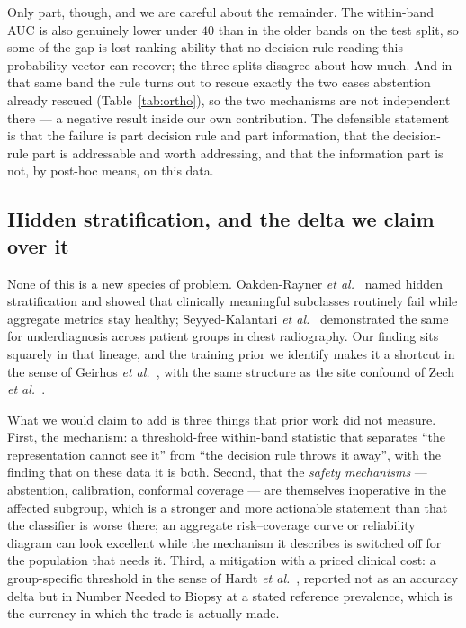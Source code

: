 \documentclass[journal]{IEEEtran}
\begin{document}
Only part, though, and we are careful about the remainder. The within-band AUC is also
genuinely lower under $40$ than in the older bands on the test split, so some of the gap is
lost ranking ability that no decision rule reading this probability vector can recover; the
three splits disagree about how much. And in that same band the rule turns out to rescue
exactly the two cases abstention already rescued (Table~\ref{tab:ortho}), so the two
mechanisms are not independent there --- a negative result inside our own contribution. The
defensible statement is that the failure is part decision rule and part information, that the
decision-rule part is addressable and worth addressing, and that the information part is not,
by post-hoc means, on this data.

\subsection{Hidden stratification, and the delta we claim over it}
None of this is a new species of problem. Oakden-Rayner
\emph{et al.}~\cite{oakdenrayner2020hidden} named hidden stratification and showed that
clinically meaningful subclasses routinely fail while aggregate metrics stay healthy;
Seyyed-Kalantari \emph{et al.}~\cite{seyyedkalantari2021underdiagnosis} demonstrated the same
for underdiagnosis across patient groups in chest radiography. Our finding sits squarely in
that lineage, and the training prior we identify makes it a shortcut in the sense of Geirhos
\emph{et al.}~\cite{geirhos2020shortcut}, with the same structure as the site confound of Zech
\emph{et al.}~\cite{zech2018confounding}.

What we would claim to add is three things that prior work did not measure. First, the
mechanism: a threshold-free within-band statistic that separates ``the representation cannot
see it'' from ``the decision rule throws it away'', with the finding that on these data it is
both. Second, that the \emph{safety mechanisms} --- abstention, calibration, conformal
coverage --- are themselves inoperative in the affected subgroup, which is a stronger and more
actionable statement than that the classifier is worse there; an aggregate risk--coverage
curve or reliability diagram can look excellent while the mechanism it describes is switched
off for the population that needs it. Third, a mitigation with a priced clinical cost:
a group-specific threshold in the sense of Hardt \emph{et al.}~\cite{hardt2016equality},
reported not as an accuracy delta but in Number Needed to Biopsy at a stated reference
prevalence, which is the currency in which the trade is actually made.
\end{document}
